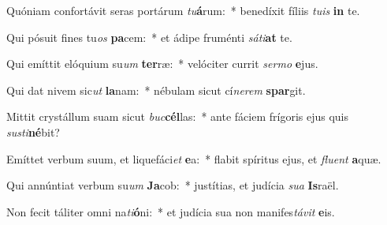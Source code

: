 \item Quóniam confortávit seras portárum \textit{tu}\textbf{á}rum:~* benedíxit fíliis \textit{tu}\textit{is} \textbf{in} te.
\item Qui pósuit fines tu\textit{os} \textbf{pa}cem:~* et ádipe fruménti \textit{sá}\textit{ti}\textbf{at} te.
\item Qui emíttit elóquium su\textit{um} \textbf{ter}ræ:~* velóciter currit \textit{ser}\textit{mo} \textbf{e}jus.
\item Qui dat nivem sic\textit{ut} \textbf{la}nam:~* nébulam sicut cí\textit{ne}\textit{rem} \textbf{spar}git.
\item Mittit crystállum suam sicut \textit{buc}\textbf{cél}las:~* ante fáciem frígoris ejus quis \textit{sus}\textit{ti}\textbf{né}bit?
\item Emíttet verbum suum, et liquefáci\textit{et} \textbf{e}a:~* flabit spíritus ejus, et \textit{flu}\textit{ent} \textbf{a}quæ.
\item Qui annúntiat verbum su\textit{um} \textbf{Ja}cob:~* justítias, et judícia \textit{su}\textit{a} \textbf{Is}raël.
\item Non fecit táliter omni na\textit{ti}\textbf{ó}ni:~* et judícia sua non manifes\textit{tá}\textit{vit} \textbf{e}is.
